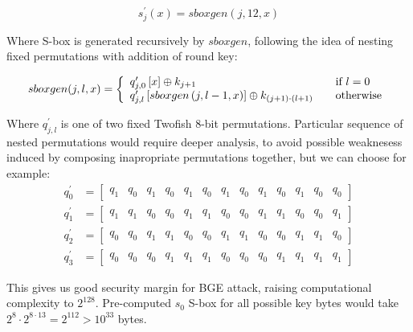\documentclass[11pt,oneside,final]{fithesis2}
\begin{document}
    \begin{equation}\label{eq:complex_sbox}
	s^{\prime}_{j}\left(x\right) = sboxgen(j,12,x)
    \end{equation}
    
    Where S-box is generated recursively by $sboxgen$, following the idea of nesting fixed permutations with addition of round key:
    
    \begin{equation}\label{eq:sboxgen}
	sboxgen(j,l,x) = \left\{ 
	\begin{array}{l l}  
	    q^{\prime}_{j,0}\left[ x \right]                          \oplus k_{j+1}		            & \quad \text{if $l=0$}\\
	    q^{\prime}_{j,l}\left[sboxgen\left(j, l-1,x\right)\right] \oplus k_{(j+1) \cdot (l+1)}          & \quad \text{otherwise}
	\end{array} \right.
    \end{equation}
    
    Where $q^{\prime}_{j,l}$ is one of two fixed Twofish 8-bit permutations. Particular sequence of nested permutations would require deeper analysis, to avoid possible weaknesess 
    induced by composing inapropriate permutations together, but we can choose for example:
    \setcounter{MaxMatrixCols}{13}
    \begin{subequations}
    \begin{align}
	q^{\prime}_{0} &= \begin{bmatrix}  q_1 & q_0 & q_1 & q_0 & q_1 & q_0 & q_1 & q_0 & q_1 & q_0 & q_1 & q_0 & q_0 \end{bmatrix}\\
	q^{\prime}_{1} &= \begin{bmatrix}  q_1 & q_1 & q_0 & q_0 & q_1 & q_1 & q_0 & q_0 & q_1 & q_1 & q_0 & q_0 & q_1 \end{bmatrix}\\
	q^{\prime}_{2} &= \begin{bmatrix}  q_0 & q_0 & q_1 & q_1 & q_0 & q_0 & q_1 & q_1 & q_0 & q_0 & q_1 & q_1 & q_0 \end{bmatrix}\\
	q^{\prime}_{3} &= \begin{bmatrix}  q_0 & q_0 & q_0 & q_1 & q_1 & q_1 & q_0 & q_0 & q_0 & q_1 & q_1 & q_1 & q_1 \end{bmatrix}
    \end{align}
    \end{subequations}

    This gives us good security margin for BGE attack, raising computational complexity to $2^{128}$. 
    Pre-computed $s_0$ S-box for all possible key bytes would take $2^8 \cdot 2^{8\cdot13} = 2^{112} > 10^{33}$ bytes. 
\end{document}
